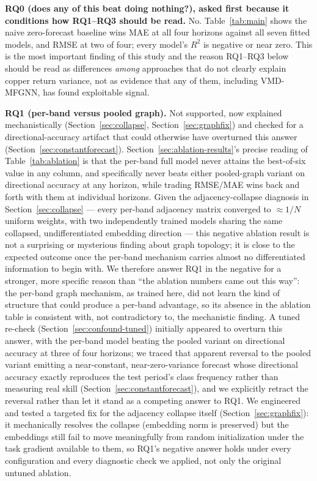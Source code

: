 \documentclass[journal]{IEEEtran}
\begin{document}
\textbf{RQ0 (does any of this beat doing nothing?), asked first because it conditions how RQ1--RQ3 should be read.} No. Table~\ref{tab:main} shows the naive zero-forecast baseline wins MAE at all four horizons against all seven fitted models, and RMSE at two of four; every model's $R^2$ is negative or near zero. This is the most important finding of this study and the reason RQ1--RQ3 below should be read as differences \emph{among} approaches that do not clearly explain copper return variance, not as evidence that any of them, including VMD-MFGNN, has found exploitable signal.

\textbf{RQ1 (per-band versus pooled graph).} Not supported, now explained mechanistically (Section~\ref{sec:collapse}, Section~\ref{sec:graphfix}) and checked for a directional-accuracy artifact that could otherwise have overturned this answer (Section~\ref{sec:constantforecast}). Section~\ref{sec:ablation-results}'s precise reading of Table~\ref{tab:ablation} is that the per-band full model never attains the best-of-six value in any column, and specifically never beats either pooled-graph variant on directional accuracy at any horizon, while trading RMSE/MAE wins back and forth with them at individual horizons. Given the adjacency-collapse diagnosis in Section~\ref{sec:collapse} --- every per-band adjacency matrix converged to $\approx 1/N$ uniform weights, with two independently trained models sharing the same collapsed, undifferentiated embedding direction --- this negative ablation result is not a surprising or mysterious finding about graph topology; it is close to the expected outcome once the per-band mechanism carries almost no differentiated information to begin with. We therefore answer RQ1 in the negative for a stronger, more specific reason than ``the ablation numbers came out this way'': the per-band graph mechanism, as trained here, did not learn the kind of structure that could produce a per-band advantage, so its absence in the ablation table is consistent with, not contradictory to, the mechanistic finding. A tuned re-check (Section~\ref{sec:confound-tuned}) initially appeared to overturn this answer, with the per-band model beating the pooled variant on directional accuracy at three of four horizons; we traced that apparent reversal to the pooled variant emitting a near-constant, near-zero-variance forecast whose directional accuracy exactly reproduces the test period's class frequency rather than measuring real skill (Section~\ref{sec:constantforecast}), and we explicitly retract the reversal rather than let it stand as a competing answer to RQ1. We engineered and tested a targeted fix for the adjacency collapse itself (Section~\ref{sec:graphfix}): it mechanically resolves the collapse (embedding norm is preserved) but the embeddings still fail to move meaningfully from random initialization under the task gradient available to them, so RQ1's negative answer holds under every configuration and every diagnostic check we applied, not only the original untuned ablation.
\end{document}
